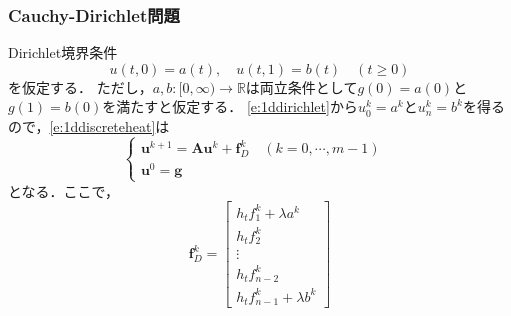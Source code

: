 \subsubsection{Cauchy-Dirichlet問題}
Dirichlet境界条件
\begin{equation}
\label{e:1ddirichlet}
u(t,0)=a(t),\quad u(t,1)=b(t)\quad(t\ge0)
\end{equation}
を仮定する．
ただし，$a,b:[0,\infty)\to\mathbb{R}$は両立条件として$g(0)=a(0)$と$g(1)=b(0)$を満たすと仮定する．
\eqref{e:1ddirichlet}から$u_0^k=a^k$と$u_{n}^k=b^k$を得るので，\eqref{e:1ddiscreteheat}は
\begin{equation}
	\begin{cases}
		\bm{u}^{k+1}=\bm{A}\bm{u}^k + \bm{f}_D^k\quad(k=0,\cdots,m-1)&\\
		\bm{u}^0=\bm{g}&
	\end{cases}
\end{equation}
となる．ここで，
\begin{equation}
\bm{f}_D^k=\left[\begin{array}{c}
	h_tf_1^k+\lambda a^k\\
	h_t f_2^k\\
	\vdots\\
	h_t f_{n-2}^k\\
	h_t f_{n-1}^k + \lambda b^k
	\end{array}\right]
\end{equation}

